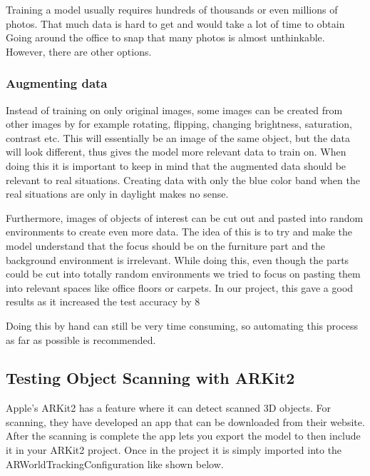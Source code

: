 Training a model usually requires hundreds of thousands or even millions of photos. That much data is hard to get and would take a lot of time to obtain Going around the office to snap that many photos is almost unthinkable.
However, there are other options.

\subsubsection{Augmenting data}
Instead of training on only original images, some images can be created from other images by for example rotating, flipping, changing brightness, saturation, contrast etc.  This will essentially be an image of the same object, but the data will look different, thus gives the model more relevant data to train on.
When doing this it is important to keep in mind that the augmented data should be relevant to real situations.
Creating data with only the blue color band when the real situations are only in daylight makes no sense.

Furthermore, images of objects of interest can be cut out and pasted into random environments to create even more data.
The idea of this is to try and make the model understand that the focus should be on the furniture part and the background environment is irrelevant. While doing this, even though the parts could be cut into totally random environments we tried to focus on pasting them into relevant spaces like office floors or carpets.
In our project, this gave a good results as it increased the test accuracy by 8%

Doing this by hand can still be very time consuming, so automating this process as far as possible is recommended.

\subsection{Testing Object Scanning with ARKit2}
Apple's ARKit2 has a feature where it can detect scanned 3D objects. For scanning, they have developed an app that can be downloaded from their website. \cite{ARScanning}
After the scanning is complete the app lets you export the model to then include it in your ARKit2 project. Once in the project it is simply imported into the ARWorldTrackingConfiguration like shown below.



